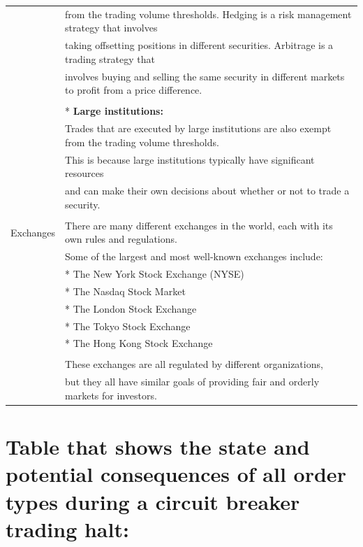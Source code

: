\documentclass[11pt]{article}
\begin{document}
\begin{center}
\begin{tabular}{ll}
 & from the trading volume thresholds. Hedging is a risk management strategy that involves\\[0pt]
 & taking offsetting positions in different securities. Arbitrage is a trading strategy that\\[0pt]
 & involves buying and selling the same security in different markets to profit from a price difference.\\[0pt]
 & \\[0pt]
 & * \textbf{\textbf{Large institutions:}}\\[0pt]
 & Trades that are executed by large institutions are also exempt from the trading volume thresholds.\\[0pt]
 & This is because large institutions typically have significant resources\\[0pt]
 & and can make their own decisions about whether or not to trade a security.\\[0pt]
 & \\[0pt]
Exchanges & There are many different exchanges in the world, each with its own rules and regulations.\\[0pt]
 & Some of the largest and most well-known exchanges include:\\[0pt]
 & * The New York Stock Exchange (NYSE)\\[0pt]
 & * The Nasdaq Stock Market\\[0pt]
 & * The London Stock Exchange\\[0pt]
 & * The Tokyo Stock Exchange\\[0pt]
 & * The Hong Kong Stock Exchange\\[0pt]
 & \\[0pt]
 & These exchanges are all regulated by different organizations,\\[0pt]
 & but they all have similar goals of providing fair and orderly markets for investors.\\[0pt]
\hline
\end{tabular}
\end{center}



\section{Table that shows the state and potential consequences of all order types during a circuit breaker trading halt:}
\label{sec:orgae139d6}
\end{document}
